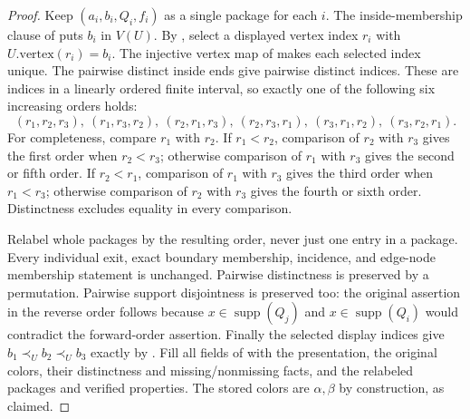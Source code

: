 \begin{proof}
Keep $(a_i,b_i,Q_i,f_i)$ as a single package for each $i$.
The inside-membership clause of  puts $b_i$ in
$V(U)$. By , select a displayed vertex
index $r_i$ with $U.\mathrm{vertex}(r_i)=b_i$. The injective vertex map
of  makes each selected index unique. The pairwise
distinct inside ends give pairwise distinct indices. These are indices
in a linearly ordered finite interval, so exactly one of the following
six increasing orders holds:
\[
 (r_1,r_2,r_3),\ (r_1,r_3,r_2),\ (r_2,r_1,r_3),\
 (r_2,r_3,r_1),\ (r_3,r_1,r_2),\ (r_3,r_2,r_1).
\]
For completeness, compare $r_1$ with $r_2$. If $r_1<r_2$, comparison
of $r_2$ with $r_3$ gives the first order when $r_2<r_3$; otherwise
comparison of $r_1$ with $r_3$ gives the second or fifth order.
If $r_2<r_1$, comparison of $r_1$ with $r_3$ gives the third order
when $r_1<r_3$; otherwise comparison of $r_2$ with $r_3$ gives the
fourth or sixth order. Distinctness excludes equality in every comparison.

Relabel whole packages by the resulting order, never just one entry in
a package. Every individual exit, exact boundary membership, incidence,
and edge-node membership statement is unchanged. Pairwise distinctness
is preserved by a permutation. Pairwise support disjointness is preserved
too: the original assertion in the reverse order follows because
$x\in\operatorname{supp}(Q_j)$ and $x\in\operatorname{supp}(Q_i)$
would contradict the forward-order assertion. Finally the selected
display indices give $b_1\prec_U b_2\prec_U b_3$ exactly by
. Fill all fields of
 with the presentation, the original
colors, their distinctness and missing/nonmissing facts, and the relabeled
packages and verified properties. The stored colors are $\alpha,\beta$
by construction, as claimed.
\end{proof}
